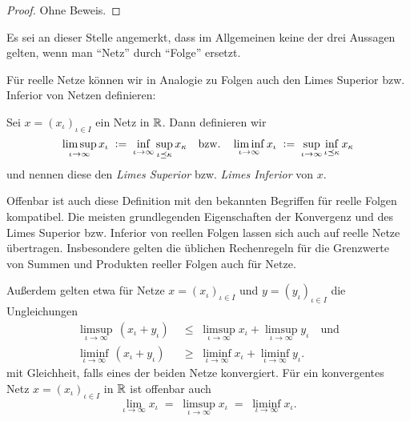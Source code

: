 \documentclass[../main/main.tex]{subfiles}
\begin{document}
	\begin{proof}
		Ohne Beweis.
	\end{proof}

	\begin{Bemerkung}
		Es sei an dieser Stelle angemerkt, dass im Allgemeinen keine der drei Aussagen gelten, wenn man \enquote{Netz} durch \enquote{Folge} ersetzt.
	\end{Bemerkung}

	Für reelle Netze können wir in Analogie zu Folgen auch den Limes Superior bzw. Inferior von Netzen definieren:
	
	\begin{Definition}
		Sei $x = (x_\iota)_{\iota \in I}$ ein Netz in $\mathbb{R}$. Dann definieren wir 
		\[ \limsup_{\iota \to \infty} x_\iota \; \vcentcolon = \; \inf_{\iota \to \infty} \sup_{\iota \preceq \kappa} x_\kappa \quad \text{bzw.} \quad 
		   \liminf_{\iota \to \infty} x_\iota \; \vcentcolon = \; \sup_{\iota \to \infty} \inf_{\iota \preceq \kappa} x_\kappa \]
		und nennen diese den \emph{Limes Superior} bzw. \emph{Limes Inferior} von $x$.
	\end{Definition}

	\begin{Bemerkung}
		Offenbar ist auch diese Definition mit den bekannten Begriffen für reelle Folgen kompatibel. Die meisten grundlegenden Eigenschaften der Konvergenz und des 
		Limes Superior bzw. Inferior von reellen Folgen lassen sich auch auf reelle Netze übertragen. 
		Insbesondere gelten die üblichen Rechenregeln für die Grenzwerte von Summen und Produkten reeller Folgen auch für Netze.
		
		Außerdem gelten etwa für Netze $x = (x_\iota)_{\iota \in I}$ und
		$y = (y_\iota)_{\iota \in I}$ die Ungleichungen
		\begin{align*}
			\limsup_{\iota \to \infty} \, (x_\iota + y_\iota) \; &\leq \; \limsup_{\iota \to \infty} x_\iota + \limsup_{\iota \to \infty} y_\iota \quad \text{und}\\
			\liminf_{\iota \to \infty} \, (x_\iota + y_\iota) \; &\geq \; \liminf_{\iota \to \infty} x_\iota + \liminf_{\iota \to \infty} y_\iota \text{.}
		\end{align*}
		mit Gleichheit, falls eines der beiden Netze konvergiert.
		Für ein konvergentes Netz $x = (x_\iota)_{\iota \in I}$ in $\mathbb{R}$ ist offenbar auch
		\[ \lim_{\iota \to \infty} x_\iota \; = \; \limsup_{\iota \to \infty} x_\iota \; = \; \liminf_{\iota \to \infty} x_\iota \text{.} \]
	\end{Bemerkung}
\end{document}
